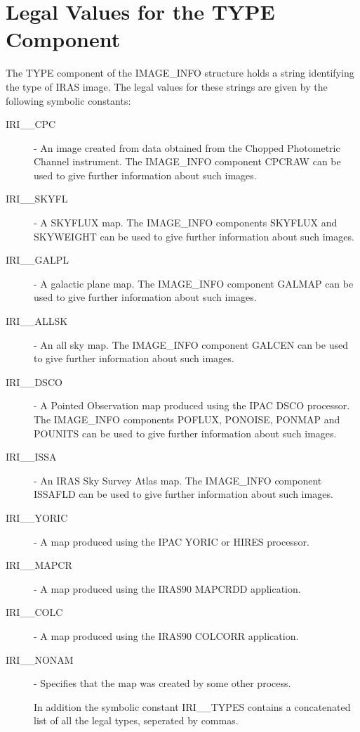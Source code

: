 \section{Legal Values for the TYPE Component}
\label{APP:TYPE}
The TYPE component of the IMAGE\_INFO structure holds a string identifying the 
type of IRAS image. The legal values for these strings are given by the 
following symbolic constants:
\begin{description}

\item [IRI\_\_CPC] - An image created from data obtained from the Chopped 
Photometric Channel instrument. The IMAGE\_INFO component CPCRAW can be used to 
give further information about such images.

\item [IRI\_\_SKYFL] - A SKYFLUX map. The IMAGE\_INFO components SKYFLUX and 
SKYWEIGHT can be used to give further information about such images.

\item [IRI\_\_GALPL] - A galactic plane map. The IMAGE\_INFO component GALMAP
can be used to give further information about such images.

\item [IRI\_\_ALLSK] - An all sky  map. The IMAGE\_INFO component GALCEN can be 
used to give further information about such images.

\item [IRI\_\_DSCO] - A Pointed Observation map produced using the IPAC DSCO
processor. The IMAGE\_INFO components POFLUX, PONOISE, PONMAP and POUNITS can be
used to give further information about such images. 

\item [IRI\_\_ISSA] - An IRAS Sky Survey Atlas map. The IMAGE\_INFO component
ISSAFLD can be used to give further information about such images.

\item [IRI\_\_YORIC] - A map produced using the IPAC YORIC or HIRES processor.

\item [IRI\_\_MAPCR] - A map produced using the IRAS90 MAPCRDD application.

\item [IRI\_\_COLC] - A map produced using the IRAS90 COLCORR application.

\item [IRI\_\_NONAM] - Specifies that the map was created by some other process.

In addition the symbolic constant IRI\_\_TYPES contains a concatenated list of 
all the legal types, seperated by commas.

\end{description}

